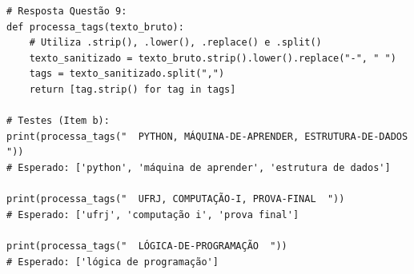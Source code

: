 \ifmostrarGabarito
\begin{verbatim}
# Resposta Questão 9:
def processa_tags(texto_bruto):
    # Utiliza .strip(), .lower(), .replace() e .split()
    texto_sanitizado = texto_bruto.strip().lower().replace("-", " ")
    tags = texto_sanitizado.split(",")
    return [tag.strip() for tag in tags]

# Testes (Item b):
print(processa_tags("  PYTHON, MÁQUINA-DE-APRENDER, ESTRUTURA-DE-DADOS  "))
# Esperado: ['python', 'máquina de aprender', 'estrutura de dados']

print(processa_tags("  UFRJ, COMPUTAÇÃO-I, PROVA-FINAL  "))
# Esperado: ['ufrj', 'computação i', 'prova final']

print(processa_tags("  LÓGICA-DE-PROGRAMAÇÃO  "))
# Esperado: ['lógica de programação']
\end{verbatim}
\fi
